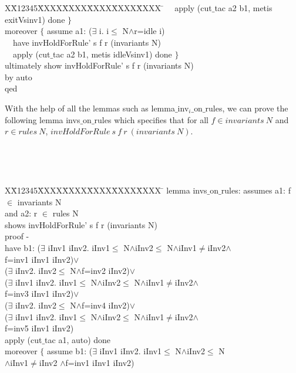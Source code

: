 \documentclass[final]{IEEEtran}
\newlength{\fminilength}
\newenvironment{fmini}[1][\linewidth]
  {\setlength{\fminilength}{#1\fboxsep-2\fboxrule}%
   \vspace{2ex}\noindent\begin{lrbox}{\fminibox}\begin{minipage}{\fminilength}%
   \mbox{ }\hfill\vspace{-2.5ex}}%
  {\end{minipage}\end{lrbox}\vspace{1ex}\hspace{0ex}%
   \framebox{\usebox{\fminibox}}}
\newenvironment{specification}
{\noindent\scriptsize
\tt\begin{fmini}\begin{tabbing}X\=X12345\=XXXX\=XXXX\=XXXX\=XXXX\=XXXX
\=\+\kill} {\end{tabbing}\normalfont\end{fmini}}
\def \twoSpaces {\ \ }
\def \iInv {iInv}
\begin{document}
{\begin{specification}
\twoSpaces      apply (cut$\_$tac a2 b1, metis exitVsinv1) done
    $\}$\\


    moreover $\{$ assume a1:
($\exists$ i. i$\le$
N$\wedge$r=idle  i)\\

\twoSpaces      have
invHoldForRule' s f r (invariants N)\\

\twoSpaces      apply (cut$\_$tac a2 b1, metis idleVsinv1) done
    $\}$\\


  ultimately show invHoldForRule' s f r (invariants N)\\
  by auto\\
qed\\

\end{specification}

With the help of all the lemmas such as {\sf lemma$\_$inv$_i\_$on$\_$rules},  we can prove the following lemma  {\sf invs$\_$on$\_$rules} which
specifies that for all $f \in invariants~ N$ and $r \in rules~ N$,   $invHoldForRule ~s~ f~ r~ (invariants~ N)$.

\begin{specification}
lemma invs$\_$on$\_$rules:
assumes a1:
f $\in$ invariants N \\
 and a2:
r $\in$ rules N\\
shows
invHoldForRule' s f r (invariants N)\\

  proof -\\
  have b1:
($\exists$ \iInv1 \iInv2. \iInv1$\le$
N$\wedge$\iInv2$\le$
N$\wedge$\iInv1$\neq$\iInv2$\wedge$\\
f=inv1  \iInv1 \iInv2)$\vee$\\
    ($\exists$ \iInv2. \iInv2$\le$
N$\wedge$f=inv2  \iInv2)$\vee$\\
    ($\exists$ \iInv1 \iInv2. \iInv1$\le$
N$\wedge$\iInv2$\le$
N$\wedge$\iInv1$\neq$\iInv2$\wedge$\\
f=inv3  \iInv1 \iInv2)$\vee$\\
    ($\exists$ \iInv2. \iInv2$\le$
N$\wedge$f=inv4  \iInv2)$\vee$\\
    ($\exists$ \iInv1 \iInv2. \iInv1$\le$
N$\wedge$\iInv2$\le$
N$\wedge$\iInv1$\neq$\iInv2$\wedge$\\
f=inv5  \iInv1 \iInv2)\\

  apply (cut$\_$tac a1, auto) done\\
    moreover $\{$      assume b1:
($\exists$ \iInv1 \iInv2. \iInv1$\le$
N$\wedge$\iInv2$\le$ N \\
$\wedge$\iInv1$\neq$\iInv2
$\wedge$f=inv1  \iInv1 \iInv2)\\


\end{specification}}
\end{document}
